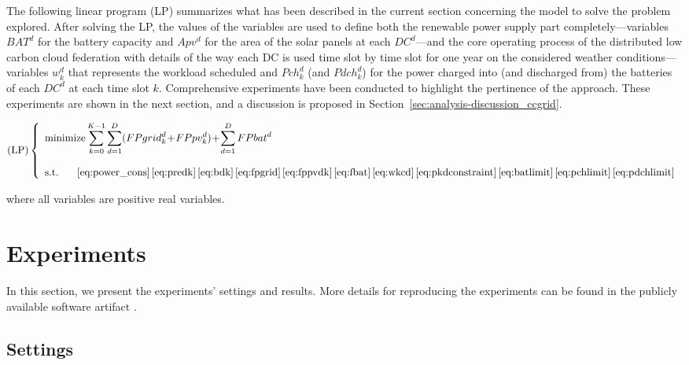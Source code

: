 The following linear program (LP) summarizes what has been described in the current section concerning the model to solve the problem explored. After solving the LP, the values of the variables are used to define both the renewable power supply part completely---variables $BAT^d$ for the battery capacity and $Apv^d$ for the area of the solar panels at each $DC^d$---and the core operating process of the distributed low carbon cloud federation with details of the way each DC is used time slot by time slot for one year on the considered weather conditions---variables $ w_k^d$ that represents the workload scheduled and $Pch^d_k$ (and $Pdch^d_k$) for the power charged into (and discharged from) the batteries of each $DC^d$ at each time slot $k$. Comprehensive experiments have been conducted to highlight the pertinence of the approach. These experiments are shown in the next section, and a discussion is proposed in Section~\ref{sec:analysis-discussion_ccgrid}.

\begin{equation}\nonumber
    \text{(LP)}\left\{
    \begin{array}{ll}
        \text{minimize}\displaystyle\sum_{k=0}^{K-1}\sum_{d=1}^D (FPgrid^d_k\!+\!FPpv^d_k)\!+\!\sum_{d=1}^D FPbat^d \label{eq:lp}\\ \\
        \text{s.t. } \ \ \ \ 
\eqref{eq:power_cons}\,\eqref{eq:predk}\,\eqref{eq:bdk}\,\eqref{eq:fpgrid}\,\eqref{eq:fppvdk}\,\eqref{eq:fbat}\,\eqref{eq:wkcd}\,\eqref{eq:pkdconstraint}\,\eqref{eq:batlimit}\,\eqref{eq:pchlimit}\,\eqref{eq:pdchlimit} %
    \end{array}
    \right.
\end{equation}

where all variables are positive real variables. 


\section{Experiments}
\label{sec:experiments_ccgrid}

In this section, we present the experiments' settings and results.  More details for reproducing the experiments can be found in the publicly available software artifact \cite{artifact_ccgrid}. 

\subsection{Settings}


